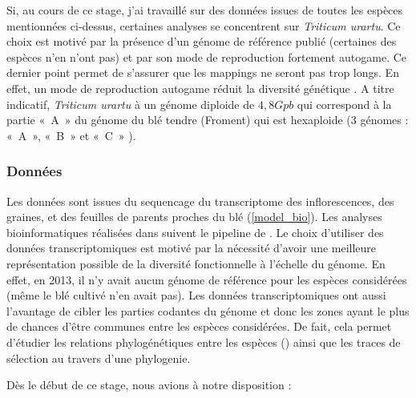\documentclass[../main]{subfiles} %
\begin{document}
Si, au cours de ce stage, j’ai travaillé sur des données issues de toutes les espèces mentionnées ci-dessus,  certaines  analyses se concentrent sur \textit{Triticum urartu}. Ce choix est motivé par la présence d'un génome de référence publié (certaines des espèces n'en n'ont pas) et par son mode de reproduction fortement \gls{autogame}. Ce dernier point permet de s'assurer que les \glspl{mapping} ne seront pas trop longs. En effet, un mode de reproduction \gls{autogame} réduit la diversité génétique \cite{burgarella_mating_2024}. A titre indicatif, \textit{Triticum urartu} à un génome \gls{diploide} de $4,8 Gpb$  qui correspond à la partie « A » du génome du blé tendre (Froment) qui est \gls{hexaploide} (3 génomes : « A », « B » et « C »  \cite{noauthor_ble_2024}).


\subsubsection{Données}
\label{sec:donnees}



Les  données sont issues du \gls{sequencage} du \gls{transcriptome}
des \glspl{inflorescence}, des graines, et des feuilles de parents proches du blé (\cref{model_bio}). Les analyses bioinformatiques réalisées dans  \cite{burgarella_mating_2024} suivent le pipeline de \cite{sarah_large_2017}. 
Le choix d’utiliser des données \glspl{transcriptomique} est motivé par la nécessité d'avoir une meilleure représentation possible de la diversité fonctionnelle à l'échelle du génome. En effet, en 2013, il n'y avait aucun génome de référence pour les espèces considérées (même le blé cultivé n'en avait pas). Les données \glspl{transcriptomique} ont aussi l'avantage de cibler les parties codantes du génome et donc les zones ayant le plus de chances d’être communes entre les espèces considérées. De fait, cela permet d’étudier les relations phylogénétiques entre les espèces (\cite{glemin_pervasive_2019}) ainsi que les traces de sélection au travers d'une \gls{phylogenie}. 


Dès le début de ce stage, nous avions à notre disposition :
\end{document}
